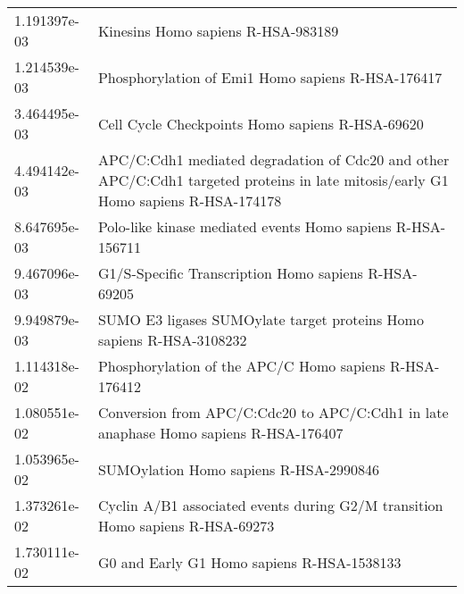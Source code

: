 \begin{longtable}{p{2.4cm}p{14.5cm}}
             1.191397e-03 &                                                                                                                     Kinesins Homo sapiens R-HSA-983189 \\
             1.214539e-03 &                                                                                                      Phosphorylation of Emi1 Homo sapiens R-HSA-176417 \\
             3.464495e-03 &                                                                                                        Cell Cycle Checkpoints Homo sapiens R-HSA-69620 \\
             4.494142e-03 &                     APC/C:Cdh1 mediated degradation of Cdc20 and other APC/C:Cdh1 targeted proteins in late mitosis/early G1 Homo sapiens R-HSA-174178 \\
             8.647695e-03 &                                                                                             Polo-like kinase mediated events Homo sapiens R-HSA-156711 \\
             9.467096e-03 &                                                                                                   G1/S-Specific Transcription Homo sapiens R-HSA-69205 \\
             9.949879e-03 &                                                                                   SUMO E3 ligases SUMOylate target proteins Homo sapiens R-HSA-3108232 \\
             1.114318e-02 &                                                                                                 Phosphorylation of the APC/C Homo sapiens R-HSA-176412 \\
             1.080551e-02 &                                                                   Conversion from APC/C:Cdc20 to APC/C:Cdh1 in late anaphase Homo sapiens R-HSA-176407 \\
             1.053965e-02 &                                                                                                                 SUMOylation Homo sapiens R-HSA-2990846 \\
             1.373261e-02 &                                                                          Cyclin A/B1 associated events during G2/M transition Homo sapiens R-HSA-69273 \\
             1.730111e-02 &                                                                                                             G0 and Early G1 Homo sapiens R-HSA-1538133 \\

\end{longtable}
